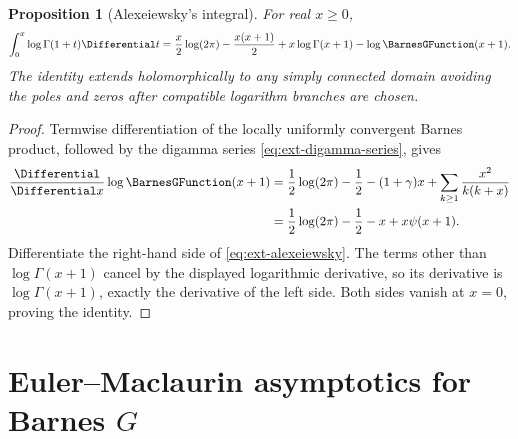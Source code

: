 \documentclass[11pt,a4paper,oneside,openany]{book}
\newtheorem{proposition}[theorem]{Proposition}
\theoremstyle{definition}
\theoremstyle{remark}
\begin{document}
\begin{proposition}[Alexeiewsky's integral]
\label{prop:ext-alexeiewsky}
For real \(x\ge0\),
\begin{equation}\label{eq:ext-alexeiewsky}
 \int_0^x\log\Gamma(1+t)\Differential t
 =\frac{x}{2}\log(2\pi)-\frac{x(x+1)}2
  +x\log\Gamma(x+1)-\log \BarnesGFunction(x+1).
\end{equation}
The identity extends holomorphically to any simply connected domain avoiding
the poles and zeros after compatible logarithm branches are chosen.
\end{proposition}
\begin{proof}
Termwise differentiation of the locally uniformly convergent Barnes product,
followed by the digamma series \eqref{eq:ext-digamma-series}, gives
\begin{align*}
 \frac{\Differential}{\Differential x}\log \BarnesGFunction(x+1)
 &=\frac12\log(2\pi)-\frac12-(1+\gamma)x
   +\sum_{k\ge1}\frac{x^2}{k(k+x)}\\
 &=\frac12\log(2\pi)-\frac12-x+x\psi(x+1).
\end{align*}
Differentiate the right-hand side of \eqref{eq:ext-alexeiewsky}.  The terms
other than \(\log\Gamma(x+1)\) cancel by the displayed logarithmic derivative,
so its derivative is \(\log\Gamma(x+1)\), exactly the derivative of the left
side.  Both sides vanish at \(x=0\), proving the identity.
\end{proof}

\section{Euler--Maclaurin asymptotics for Barnes \texorpdfstring{$G$}{G}}
\end{document}
